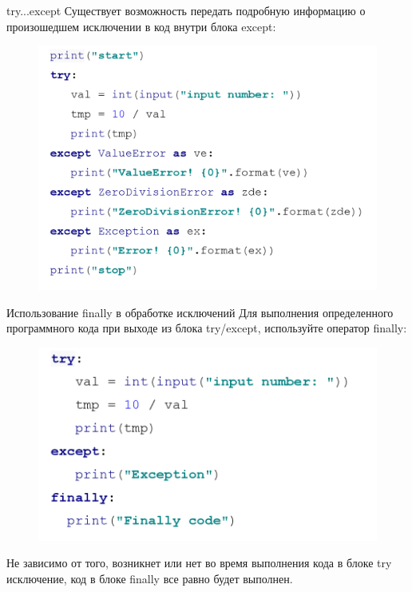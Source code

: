 \documentclass[xcolor=table]{beamer}
\begin{document}
\begin{frame}{try...except}
	Существует возможность передать подробную информацию о произошедшем исключении в код внутри блока except:
	\begin{figure}[h]
		\centering
		\includegraphics[scale=0.7]{images/lec08-pic08-python.png}
	\end{figure}
\end{frame}

\begin{frame}{Использование finally в обработке исключений}
	Для выполнения определенного программного кода при выходе из блока try/except, используйте оператор finally:
	\begin{figure}[h]
		\centering
		\includegraphics[scale=0.7]{images/lec08-pic09-python.png}
	\end{figure}
	Не зависимо от того, возникнет или нет во время выполнения кода в блоке try исключение, код в блоке finally все равно будет выполнен.
\end{frame}
\end{document}
